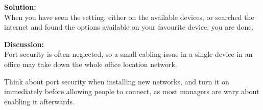 \documentclass[a4paper,11pt,notitlepage]{report}
\begin{document}
{\bf Solution:}\\
When you have seen the setting, either on the available devices, or searched the internet and found the options available on your favourite device, you are done.

{\bf Discussion:}\\
Port security is often neglected, so a small cabling issue in a single device in an office may take down the whole office location network.

Think about port security when installing new networks, and turn it on immediately before allowing people to connect, as most managers are wary about enabling it afterwards.
\end{document}
